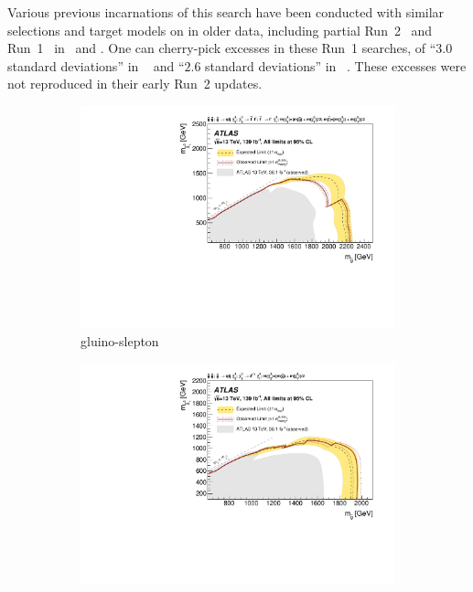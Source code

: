 Various previous incarnations of this search have been conducted with similar
selections and target models on in older data, including partial Run~2~\cite{
atlas_susy_strong_2l_partial_run2_1,
atlas_susy_strong_2l_partial_run2,
cms_susy_2016_strong_2l_run2_1,
cms_susy_2016_strong_2l_run2
} and Run~1~\cite{
atlas_susy_strong_2l_run1,
cms_susy_2016_strong_2l_run1
} in \atlas\ and \cms.
One can cherry-pick excesses in these Run~1 searches,
of ``$3.0$ standard deviations'' in \atlas~\cite{atlas_susy_strong_2l_run1}
and ``$2.6$ standard deviations'' in \cms~\cite{cms_susy_2016_strong_2l_run1}.
These excesses were not reproduced in their early Run~2 updates.

\begin{figure}[tp]
\centering
\begin{subfigure}{0.49\textwidth}
    \centering
    \includegraphics[width=\textwidth]{figures/2ljets_strong_contours_gluino_slepton.pdf}
    \caption{gluino-slepton}
\end{subfigure}
\hfill
\begin{subfigure}{0.49\textwidth}
    \centering
    \includegraphics[width=\textwidth]{figures/2ljets_strong_contours_gluino_z.pdf}

\end{subfigure}
\end{figure}

